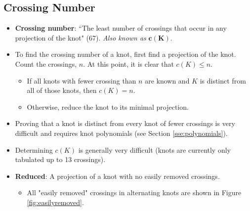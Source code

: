 \documentclass[titlepage]{article}
\numberwithin{figure}{section}
\numberwithin{table}{section}
\numberwithin{equation}{section}
\newcommand{\dq}[2]{``#1" (#2).}
\begin{document}
\subsection{Crossing Number}
\begin{itemize}
    \item \textbf{Crossing number}: \dq{The least number of crossings that occur in any projection of the knot}{67} \emph{Also known as} $\mathbf{c(K)}$.
    \item To find the crossing number of a knot, first find a projection of the knot. Count the crossings, $n$. At this point, it is clear that $c(K)\leq n$.
    \begin{itemize}
        \item If all knots with fewer crossing than $n$ are known and $K$ is distinct from all of those knots, then $c(K)=n$.
        \item Otherwise, reduce the knot to its minimal projection.
    \end{itemize}
    \item Proving that a knot is distinct from every knot of fewer crossings is very difficult and requires knot polynomials (see Section \ref{sse:polynomials}).
    \item Determining $c(K)$ is generally very difficult (knots are currently only tabulated up to 13 crossings).
    \item \textbf{Reduced}: A projection of a knot with no easily removed crossings.
    \begin{itemize}
        \item All "easily removed" crossings in alternating knots are shown in Figure \ref{fig:easilyremoved}.
    \end{itemize}
    \begin{figure}[h!]
        \centering
\end{figure}
\end{itemize}
\end{document}
